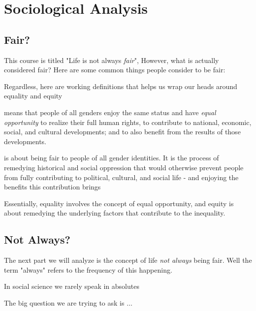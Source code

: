 \chapter{Sociological Analysis}

\section{Fair?}
This course is titled "Life is not always \emph{fair}", However, what is actually considered fair? Here are some common things people consider to be fair:
\begin{bullets}
	\item {}
	\item {}
\end{bullets}

Regardless, here are working definitions that helps us wrap our heads around equality and equity

\begin{definition}
	 means that people of all genders enjoy the same status and have \emph{equal opportunity} to realize their full human rights, to contribute to national, economic, social, and cultural developments; and to also benefit from the results of those developments.
\end{definition}

\begin{definition}
	 is about being fair to people of all gender identities. It is the process of remedying historical and social oppression that would otherwise prevent people from fully contributing to political, cultural, and social life - and enjoying the benefits this contribution brings
\end{definition}

Essentially, equality involves the concept of equal opportunity, and equity is about remedying the underlying factors that contribute to the inequality.

\section{Not Always?}

The next part we will analyze is the concept of life \emph{not always} being fair. Well the term "always" refers to the frequency of this happening.
\begin{bullets}
	\item In social science we rarely speak in absolutes
\end{bullets}
The big question we are trying to ask is $\ldots$


